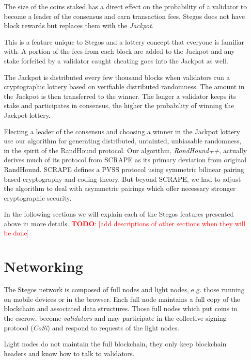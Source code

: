 \documentclass[a4paper, 10pt, conference]{ieeeconf}
\newcommand\todo[1]{\textcolor{red}{\textbf{TODO}: [#1]}}
\begin{document}
The size of the coins staked has a direct effect on the probability of a validator to become a leader of the consensus and earn transaction fees. Stegos does not have block rewards but replaces them with the \textit{Jackpot}.

This is a feature unique to Stegos and a lottery concept that everyone is familiar with. A portion of the fees from each block are added to the Jackpot and any stake forfeited by a validator caught cheating goes into the Jackpot as well.

The Jackpot is distributed every few thousand blocks when validators run a cryptographic lottery based on verifiable distributed randomness. The amount in the Jackpot is then transferred to the winner. The longer a validator keeps its stake and participates in consensus, the higher the probability of winning the Jackpot lottery.

Electing a leader of the consensus and choosing a winner in the Jackpot lottery use our algorithm for generating distributed, untainted, unbiasable randomness, in the spirit of the RandHound protocol\cite{c12}. Our algorithm, \textit{RandHound++}, actually derives much of its protocol from SCRAPE\cite{c13} as its primary deviation from original RandHound. SCRAPE defines a PVSS\cite{c14} protocol using symmetric bilinear pairing based cryptography and coding theory. But beyond SCRAPE, we had to adjust the algorithm to deal with asymmetric pairings which offer necessary stronger cryptographic security.

In the following sections we will explain each of the Stegos features presented above in more details. \todo{add descriptions of other sections when they will be done}

\section{Networking}\label{networking}

The Stegos network is composed of full nodes and light nodes, e.g. those running on mobile devices or in the browser. Each full node maintains a full copy of the blockchain and associated data structures. Those full nodes which put coins in the escrow, become \textit{validators} and may participate in the collective signing protocol (\textit{CoSi}) and respond to requests of the light nodes. 

Light nodes do not maintain the full blockchain, they only keep blockchain headers and know how to talk to validators. 
\end{document}
